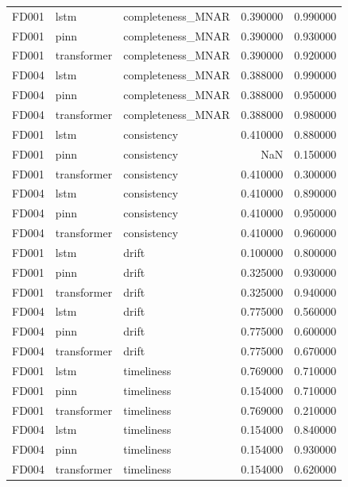 \begin{table}
\begin{tabular}{lllrr}
FD001 & lstm & completeness\_MNAR & 0.390000 & 0.990000 \\
FD001 & pinn & completeness\_MNAR & 0.390000 & 0.930000 \\
FD001 & transformer & completeness\_MNAR & 0.390000 & 0.920000 \\
FD004 & lstm & completeness\_MNAR & 0.388000 & 0.990000 \\
FD004 & pinn & completeness\_MNAR & 0.388000 & 0.950000 \\
FD004 & transformer & completeness\_MNAR & 0.388000 & 0.980000 \\
FD001 & lstm & consistency & 0.410000 & 0.880000 \\
FD001 & pinn & consistency & NaN & 0.150000 \\
FD001 & transformer & consistency & 0.410000 & 0.300000 \\
FD004 & lstm & consistency & 0.410000 & 0.890000 \\
FD004 & pinn & consistency & 0.410000 & 0.950000 \\
FD004 & transformer & consistency & 0.410000 & 0.960000 \\
FD001 & lstm & drift & 0.100000 & 0.800000 \\
FD001 & pinn & drift & 0.325000 & 0.930000 \\
FD001 & transformer & drift & 0.325000 & 0.940000 \\
FD004 & lstm & drift & 0.775000 & 0.560000 \\
FD004 & pinn & drift & 0.775000 & 0.600000 \\
FD004 & transformer & drift & 0.775000 & 0.670000 \\
FD001 & lstm & timeliness & 0.769000 & 0.710000 \\
FD001 & pinn & timeliness & 0.154000 & 0.710000 \\
FD001 & transformer & timeliness & 0.769000 & 0.210000 \\
FD004 & lstm & timeliness & 0.154000 & 0.840000 \\
FD004 & pinn & timeliness & 0.154000 & 0.930000 \\
FD004 & transformer & timeliness & 0.154000 & 0.620000 \\
\bottomrule
\end{tabular}
\end{table}
